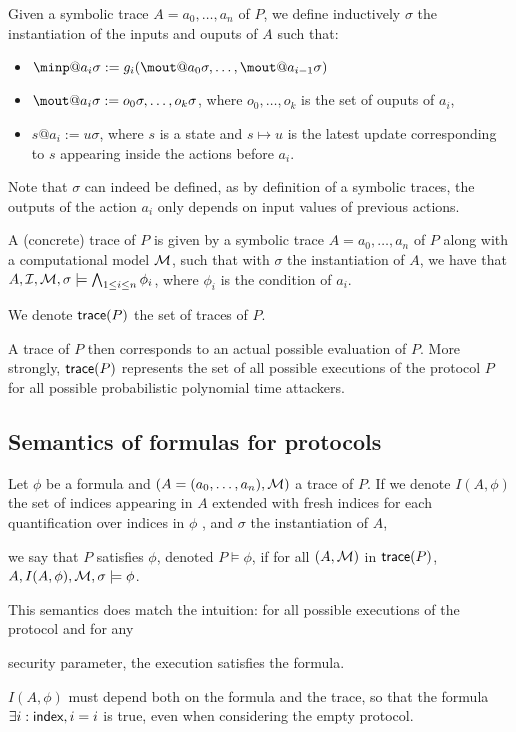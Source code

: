\begin{definition}
  Given a symbolic trace $A = a_0,\dots,a_n$ of $P$, we define inductively $\sigma$ the instantiation of the inputs and ouputs of $A$ such that:
  \begin{itemize}
  \item $\minp@a_i\sigma := g_i( \mout@a_0\sigma,\dots,\mout@a_{i-1}\sigma  ) $
  \item $\mout@a_i\sigma := o_0\sigma, \dots, o_k\sigma$, where $o_0,\dots,o_k$ is the set of ouputs of  $a_i$,
    \item $s@a_i := u\sigma$, where $s$ is a state and $s \mapsto u$ is the latest update corresponding to $s$ appearing inside the actions before $a_i$.
\end{itemize}
\end{definition}
Note that $\sigma$ can indeed be defined, as by definition of a symbolic traces, the outputs of the action $a_i$ only depends on input values of previous actions.

\begin{definition}
  A (concrete) trace of $P$ is given by a symbolic trace $A = a_0,\dots,a_n$ of $P$ along with a computational model $\mathcal{M}$, such that with $\sigma$ the instantiation of $A$, we have that $A,\mathcal{I},\mathcal{M},\sigma \models \bigwedge_{1\leq i \leq n} \phi_i$, where $\phi_i$ is the condition of $a_i$.

  We denote $\textsf{trace}(P)$ the set of traces of $P$.
\end{definition}

A trace of $P$ then corresponds to an actual possible evaluation of $P$. More strongly, $\textsf{trace}(P)$ represents the set of all possible executions of the protocol $P$ for all possible probabilistic polynomial time attackers.

\subsection{Semantics of formulas for protocols}

\begin{definition}
  Let $\phi$ be a formula and $(A=(a_0,\dots,a_n),\mathcal{M})$ a trace of $P$. If we denote $I(A,\phi)$ the set of indices appearing in $A$ extended with fresh indices for each quantification over indices in $\phi$ , and $\sigma$ the instantiation of $A$,

we say that $P$ satisfies $\phi$, denoted $P \models \phi$, if for all $(A,\mathcal{M})$ in $\textsf{trace}(P)$, $A, I(A,\phi), \mathcal{M}, \sigma \models \phi$.

\end{definition}

This semantics does match the intuition: for all possible executions of the protocol and for any

security parameter, the execution satisfies the formula.

$I(A,\phi)$ must depend both on the formula and the trace, so that the formula $\exists i:\textsf{index}, i=i$ is true, even when considering the empty protocol.
